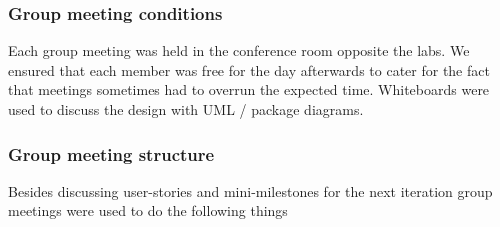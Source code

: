 \documentclass[11pt]{article}
\begin{document}
\subsubsection{Group meeting conditions}
Each group meeting was held in the conference room opposite the labs. We
ensured that each member was free for the day afterwards to cater for the
fact that meetings sometimes had to overrun the expected time. Whiteboards
were used to discuss the design with UML / package diagrams.

\subsubsection{Group meeting structure}
Besides discussing user-stories and mini-milestones for the next
iteration group meetings were used to do the following things
\end{document}
